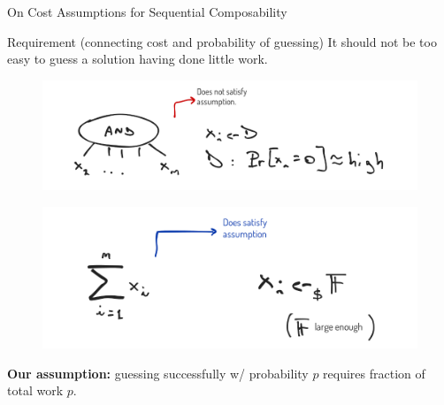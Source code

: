 \begin{frame}{On Cost Assumptions for Sequential Composability}
\begin{block}{Requirement (connecting cost and probability of guessing)}\pause
	It should not be too easy to guess a solution having done little work. 
\end{block}	
	
\pause
\begin{figure}
	\includegraphics[scale=0.2]{pics/example-and.png}
\end{figure}
\pause
\begin{figure}
	\includegraphics[scale=0.2]{pics/example-sum.png}
\end{figure}
\pause
\textbf{Our assumption:} guessing successfully w/ probability $p$ requires fraction of total work $p$.
\end{frame}